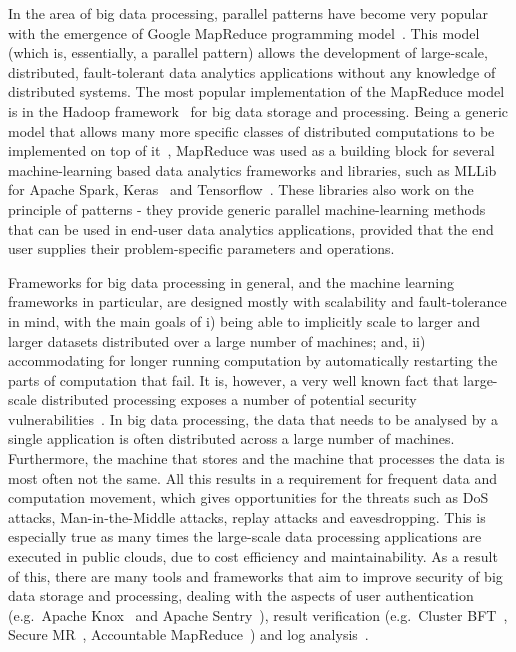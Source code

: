 \documentclass[a4paper,11pt]{article}
\begin{document}
In the area of big data processing, parallel patterns have become very popular with the emergence of Google MapReduce programming model~\cite{mapreduce}. This model (which is, essentially, a parallel pattern) allows the development of large-scale, distributed, fault-tolerant data analytics applications without any knowledge of distributed systems. The most popular implementation of the MapReduce model is in the Hadoop framework~\cite{hadoop} for big data storage and processing. Being a generic model that allows many more specific classes of distributed computations to be implemented on top of it~\cite{bigdatabook}, MapReduce was used as a building block for several machine-learning based data analytics frameworks and libraries, such as MLLib~\cite{mllib} for Apache Spark, Keras~\cite{keras} and Tensorflow~\cite{tensorflow}. These libraries also work on the principle of patterns - they provide generic parallel machine-learning methods that can be used in end-user data analytics applications, provided that the end user supplies their problem-specific parameters and operations.

Frameworks for big data processing in general, and the machine learning frameworks in particular, are designed mostly with scalability and fault-tolerance in mind, with the main goals of i) being able to implicitly scale to larger and larger datasets distributed over a large number of machines; and, ii) accommodating for longer running computation by automatically restarting the parts of computation that fail. It is, however, a very well known fact that large-scale distributed processing exposes a number of potential security vulnerabilities~\cite{bigdatasecurity}. In big data processing, the data that needs to be analysed by a single application is often distributed across a large number of machines. Furthermore, the machine that stores and the machine that processes the data is most often not the same. All this results in a requirement for frequent data and computation movement, which gives opportunities for the threats such as DoS attacks, Man-in-the-Middle attacks, replay attacks and eavesdropping. This is especially true as many times the large-scale data processing applications are executed in public clouds, due to cost efficiency and maintainability. As a result of this, there are many tools and frameworks that aim to improve security of big data storage and processing, dealing with the aspects of user authentication (e.g.~Apache Knox~\cite{knox} and Apache Sentry~\cite{sentry}), result verification (e.g.~Cluster BFT~\cite{bft}, Secure MR~\cite{securemr}, Accountable MapReduce~\cite{accountablemr}) and log analysis~\cite{loganalysis}. 
\end{document}
